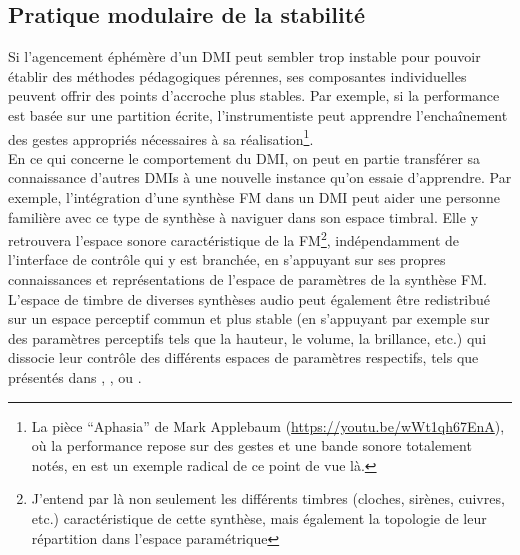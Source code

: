 \subsection{Pratique modulaire de la stabilité}

\noindent Si l'agencement éphémère d'un \gls{DMI} peut sembler trop instable pour pouvoir établir des méthodes pédagogiques pérennes, ses composantes individuelles peuvent offrir des points d'accroche plus stables. Par exemple, si la performance est basée sur une partition écrite, l'instrumentiste peut apprendre l'enchaînement des gestes appropriés nécessaires à sa réalisation\footnote{La pièce ``Aphasia'' de Mark Applebaum (\url{https://youtu.be/wWt1qh67EnA}), où la performance repose sur des gestes et une bande sonore totalement notés, en est un exemple radical de ce point de vue là.}.\\
\indent En ce qui concerne le comportement du \gls{DMI}, on peut en partie transférer sa connaissance d'autres \glspl{DMI} à une nouvelle instance qu'on essaie d'apprendre. Par exemple, l'intégration d'une synthèse \gls{FM} dans un \gls{DMI} peut aider une personne familière avec ce type de synthèse à naviguer dans son espace timbral. Elle y retrouvera l'espace sonore caractéristique de la \gls{FM}\footnote{J'entend par là non seulement les différents timbres (cloches, sirènes, cuivres, etc.) caractéristique de cette synthèse, mais également la topologie de leur répartition dans l'espace paramétrique}, indépendamment de l'interface de contrôle qui y est branchée, en s'appuyant sur ses propres connaissances et représentations de l'espace de paramètres de la synthèse \gls{FM}. L'espace de timbre de diverses synthèses audio peut également être redistribué sur un espace perceptif commun et plus stable (en s'appuyant par exemple sur des paramètres perceptifs tels que la hauteur, le volume, la brillance, etc.) qui dissocie leur contrôle des différents espaces de paramètres respectifs, tels que présentés dans \cite{wessel_timbre_1979}, \cite{arfib_strategies_2002}, \cite{schwarz_sound_2012} ou \cite{tubb_divergent_2014}.

